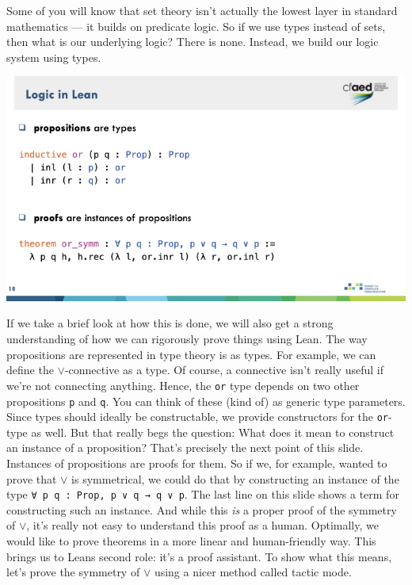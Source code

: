 \documentclass{article}
\begin{document}
Some of you will know that set theory isn't actually the lowest layer in standard mathematics --- it builds on predicate logic.
So if we use types instead of sets, then what is our underlying logic?
There is none.
Instead, we build our logic system using types.

\begin{center}
    \includegraphics[width=\columnwidth]{Slides/Slide 18.jpeg}
\end{center}

If we take a brief look at how this is done, we will also get a strong understanding of how we can rigorously prove things using Lean.
The way propositions are represented in type theory is as types.
For example, we can define the $\vee$-connective as a type.
Of course, a connective isn't really useful if we're not connecting anything.
Hence, the \verb|or| type depends on two other propositions \verb|p| and \verb|q|.
You can think of these (kind of) as generic type parameters.
Since types should ideally be constructable, we provide constructors for the \verb|or|-type as well. 
But that really begs the question:
What does it mean to construct an instance of a proposition?
That's precisely the next point of this slide.
Instances of propositions are proofs for them.
So if we, for example, wanted to prove that $\vee$ is symmetrical, we could do that by constructing an instance of the type \verb|∀ p q : Prop, p ∨ q → q ∨ p|.
The last line on this slide shows a term for constructing such an instance.
And while this \emph{is} a proper proof of the symmetry of $\vee$, it's really not easy to understand this proof as a human.
Optimally, we would like to prove theorems in a more linear and human-friendly way.
This brings us to Leans second role: it's a proof assistant.
To show what this means, let's prove the symmetry of $\vee$ using a nicer method called tactic mode.
\end{document}
